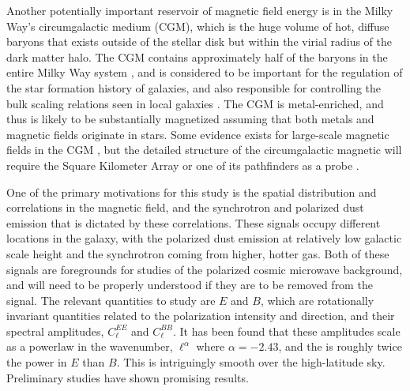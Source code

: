 Another potentially important reservoir of  magnetic field energy is in the Milky Way's
circumgalactic medium (CGM), which is the huge volume of hot, diffuse
baryons that exists outside of the stellar disk but within the virial
radius of the dark matter halo.  The CGM  contains approximately half
of the baryons in the entire Milky Way system \citep[see,
e.g.,][]{2014ApJ...786...54P}, and is considered to be important for
the regulation of the star formation history of galaxies, and also responsible for
controlling the bulk scaling relations  seen in local galaxies
\citep{2015ApJ...808L..30V,2017ApJ...845...80V}.  The CGM is
metal-enriched, and thus is likely to be
substantially magnetized assuming that both metals and magnetic fields
originate in stars.  Some evidence exists for large-scale
magnetic fields in the CGM \citep[see,
e.g., Figure 7 in][]{2017ARA&A..55..111H}, but the detailed structure
of the circumgalactic magnetic will require the Square Kilometer Array
or one of its pathfinders as a probe \citep{2015aska.confE..41H}.

One of the primary motivations for this study is the spatial distribution and
correlations in the magnetic field, and the synchrotron and polarized dust
emission that is dictated by these correlations.  These signals occupy different
locations in the galaxy, with the polarized dust emission at relatively low
galactic scale height and the synchrotron coming from higher, hotter gas.  Both
of these signals are foregrounds for studies of the polarized cosmic microwave
background, and will need to be properly understood if they are to be removed
from the signal.  The relevant quantities to study are $E$ and $B$, which are
rotationally invariant quantities related to the polarization intensity and
direction, and their spectral amplitudes, $C_\ell^{EE}$ and $C_\ell^{BB}$.  It has been found 
that these amplitudes scale as a powerlaw in the wavenumber, $\ell^\alpha$ where
$\alpha=-2.43$, and the is roughly twice the power in $E$ than $B$.  This is
intriguingly smooth over the high-latitude sky.  Preliminary studies 
 have shown promising results.  

